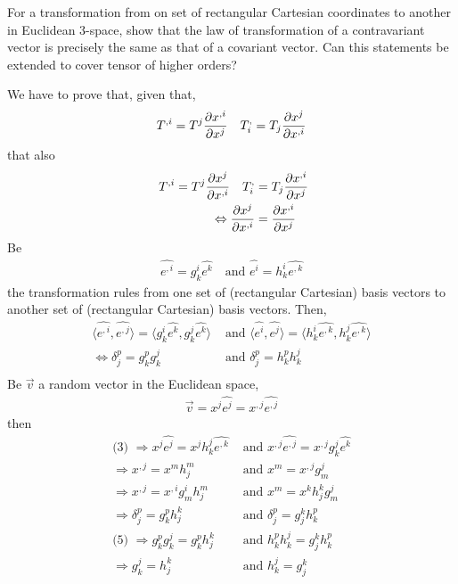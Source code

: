 \begin{tcolorbox}
For a transformation from on set of rectangular Cartesian coordinates to another in Euclidean 3-space, show that the law of transformation of a contravariant vector is precisely the same as that of a covariant vector. Can this statements be extended to cover tensor of higher orders?
\end{tcolorbox}
We have to prove that, given that, $$T^{,i}= T^{j} \pdv{x^{,i}}{x^j} \quad T^{,}_{i}= T_{j} \pdv{x^{j}}{x^{,i}}$$ that also
\begin{align}
\ T^{,i}= T^{j} \pdv{x^{j}}{x^{,i}} \quad T^{,}_{i}&= T_{j}\pdv{x^{,i}}{x^j} \\
\Leftrightarrow \pdv{x^{j}}{x^{,i}} &= \pdv{x^{,i}}{x^j} 
\end{align}
Be
\begin{align}
\hat{e^{,i}} = g^i_k\hat{e^{k}}\quad\text{and } \hat{e^{i}} = h^i_k\hat{e^{,k}}
\end{align}
the transformation rules from one set of (rectangular Cartesian) basis vectors to another set of  (rectangular Cartesian) basis vectors.
Then,
\begin{align}
\langle \hat{e^{,i}},\hat{e^{,j}} \rangle = \langle g^i_k\hat{e^{k}},g^j_k\hat{e^{k}} \rangle &\text{ and } \langle \hat{e^{i}},\hat{e^{j}} \rangle = \langle h^i_k\hat{e^{,k}},h^j_k\hat{e^{,k}} \rangle\\
\Leftrightarrow \delta^p_j = g^p_k g^j_k &\text{ and } \delta^p_j = h^p_k h^j_k \\
\end{align}
Be $\vec{v}$ a random vector in the Euclidean space,
\begin{align}
\vec{v} = x^j\hat{e^{j}} = x^{,j}\hat{e^{,j}}
\end{align}
then
\begin{align}
\text{(3) } \Rightarrow x^j\hat{e^{j}} = x^{j}h^j_k\hat{e^{,k}}&\text{ and }x^{,j}\hat{e^{,j}} = x^{,j}g^j_k\hat{e^{k}}\\
\Rightarrow x^{,j} = x^{m}h^m_j  &\text{ and }x^m = x^{,j}g^j_m\\
\Rightarrow x^{,j} = x^{,i}g^i_m h^m_j&\text{ and } x^m = x^{k}h^k_j g^j_m \\
\Rightarrow \delta^p_j =g^p_k h^k_j &\text{ and } \delta^p_j =g^k_j h^p_k\\
\text{(5) } \Rightarrow g^p_k g^j_k=g^p_k h^k_j &\text{ and } h^p_k h^j_k=g^k_j h^p_k\\
 \Rightarrow g^j_k =  h^k_j &\text{ and }h^j_k =  g^k_j
\end{align}
